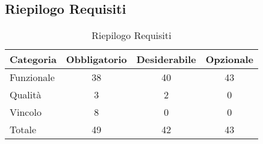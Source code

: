\subsection{Riepilogo Requisiti}{ 
\renewcommand*{\arraystretch}{1.4} 
\begin{table}[h] 
 \begin{center} 
\begin{tabular}[c]{| p{2.5cm} | c | c | c |}  
\hline \textbf{Categoria} & \textbf{Obbligatorio} & \textbf{Desiderabile} & \textbf{Opzionale} \\ \hline 
Funzionale & 38 & 40 & 43\\ 
 \hline 
Qualità & 3 & 2 & 0\\ 
 \hline 
Vincolo & 8 & 0 & 0\\ 
 \hline 
Totale & 49 & 42 & 43\\ 
 \hline 
\end{tabular} 
 \caption{Riepilogo Requisiti\label{tab:riepilogo}}\end{center} 
 \end{table}}